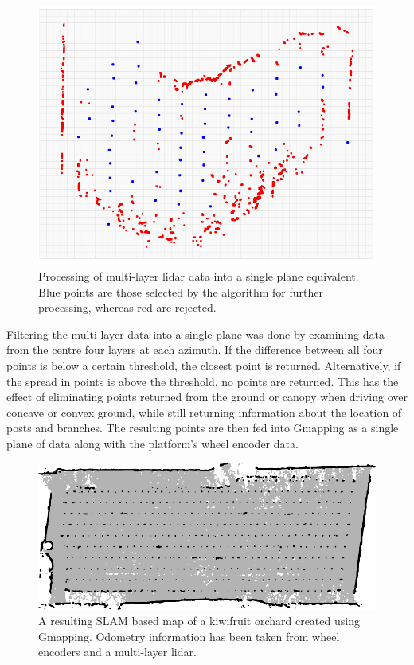 \documentclass[preprint,authoryear,12pt]{elsarticle}
\begin{document}
        \begin{figure}[htb]
            \centering
            \includegraphics[width=\linewidth]{imgs/single_plane_extraction/single_plane_extraction.pdf}
            \caption{
                Processing of multi-layer lidar data into a single plane equivalent.
                Blue points are those selected by the algorithm for further processing, whereas red are rejected.
            }
            \label{fig:singlePlaneExtraction}
        \end{figure}

        Filtering the multi-layer data into a single plane was done by examining data from the centre four layers at each azimuth.
        If the difference between all four points is below a certain threshold, the closest point is returned.
        Alternatively, if the spread in points is above the threshold, no points are returned.
        This has the effect of eliminating points returned from the ground or canopy when driving over concave or convex ground, while still returning information about the location of posts and branches.
        The resulting points are then fed into Gmapping as a single plane of data along with the platform's wheel encoder data.

        \begin{figure}[htb]
            \centering
            \includegraphics{imgs/gmapmap/gmapmap.pdf}
            \caption{
                A resulting SLAM based map of a kiwifruit orchard created using Gmapping.
                Odometry information has been taken from wheel encoders and a multi-layer lidar.
            }
            \label{fig:gmapmap}
        \end{figure}
\end{document}

